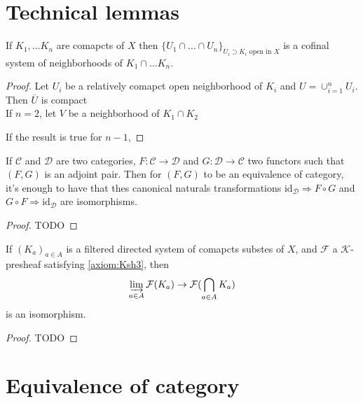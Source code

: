 \section{Technical lemmas}

\begin{lemma}
    \label{lem:cofinal_syst_of_inter_compact}
    If $K_1,\ldots K_n$ are comapcts of $X$ then $\{U_1\cap\ldots\cap U_n\}_{U_i\supset K_i\text{ open in }X}$ is a cofinal system of neighborhoods of $K_1\cap \ldots K_n$.
\end{lemma}

\begin{proof}
   Let $U_i$ be a relatively comapct open neighborhood of $K_i$ and $U=\cup_{i=1}^nU_i$. Then $\overline{U}$ is compact \\

   If $n=2$, let $V$ be a neighborhood of $K_1\cap K_2$

   If the result is true for $n-1$, 
\end{proof}

\begin{lemma}
    \label{lem:equiv_of_adj}
    \leanok
    If $\mathcal{C}$ and $\mathcal{D}$ are two categories, $F:\mathcal{C}\to \mathcal{D}$ and $G:\mathcal{D}\to \mathcal{C}$ two functors such that $(F,G)$ is an adjoint pair. Then for $(F,G)$ to be an equivalence of category, it's enough to have that thes canonical naturals transformations $\text{id}_{\mathcal{D}}\Rightarrow F\circ G$ and $G\circ F\Rightarrow \text{id}_{\mathcal{D}}$ are isomorphisms.
\end{lemma}

\begin{proof}
    \leanok
    TODO%
\end{proof}

\begin{lemma}
    \label{lem:a_nommer}
    If $(K_a)_{a\in A}$ is a filtered directed system of comapcts substes of $X$, and $\mathcal{F}$ a $\mathcal{K}$-presheaf satisfying \eqref{axiom:Ksh3}, then \[\varinjlim\limits_{a\in A}\mathcal{F}(K_a)\to \mathcal{F}(\bigcap\limits_{a\in A}K_a)\] is an isomorphism.
\end{lemma}
\begin{proof}
    TODO
\end{proof}

\section{Equivalence of category}

